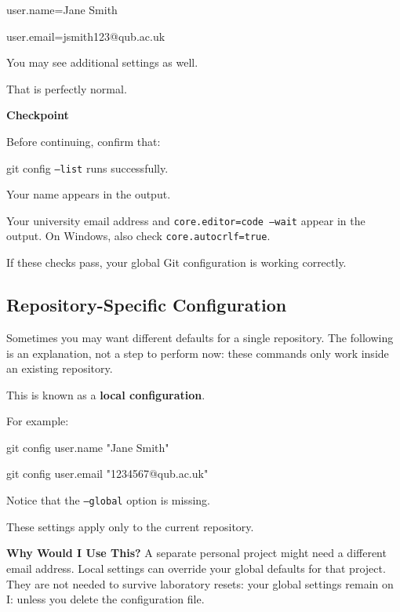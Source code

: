 \documentclass{csc2059practical}
\begin{document}
\begin{terminalplain}
user.name=Jane Smith
\end{terminalplain}
\begin{terminalplain}
user.email=jsmith123@qub.ac.uk
\end{terminalplain}
You may see additional settings as well.

That is perfectly normal.

\begin{reflectionbox}
\textbf{Checkpoint}\par
\medskip
Before continuing, confirm that:
\end{reflectionbox}
\begin{terminalplain}
git config \texttt{--list} runs successfully.
\end{terminalplain}
Your name appears in the output.

Your university email address and \texttt{core.editor=code --wait} appear in the output. On Windows, also check \texttt{core.autocrlf=true}.

If these checks pass, your global Git configuration is working correctly.

\subsection{Repository-Specific Configuration}
Sometimes you may want different defaults for a single repository. The following is an explanation, not a step to perform now: these commands only work inside an existing repository.

This is known as a \textbf{local configuration}.

For example:

\begin{terminalplain}
git config user.name "Jane Smith"
\end{terminalplain}
\begin{terminalplain}
git config user.email "1234567@qub.ac.uk"
\end{terminalplain}
Notice that the \texttt{--global} option is missing.

These settings apply only to the current repository.

\begin{importantnote}
\textbf{Why Would I Use This?}
A separate personal project might need a different email address. Local settings can override your global defaults for that project. They are not needed to survive laboratory resets: your global settings remain on I: unless you delete the configuration file.
\end{importantnote}
\end{document}
